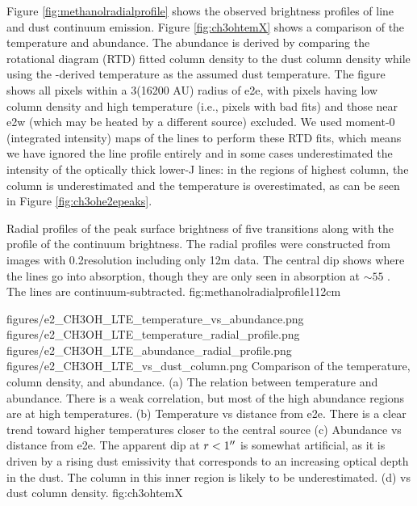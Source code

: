 \documentclass{aa}
\begin{document}
Figure \ref{fig:methanolradialprofile} shows the observed brightness profiles
of \methanol line and dust continuum emission.
Figure \ref{fig:ch3ohtemX} shows a comparison of the \methanol temperature and
abundance.  The \methanol abundance is derived by comparing the rotational
diagram (RTD) fitted \methanol column density to the dust column density while
using the \methanol-derived temperature as the assumed dust temperature.  The
figure shows all pixels within a 3\arcsec (16200 AU) radius of e2e, with pixels
having low column density and high temperature (i.e., pixels with bad fits) and
those near e2w (which may be heated by a different source) excluded.  We used
moment-0 (integrated intensity) maps of the \methanol lines to perform these
RTD fits, which means we have ignored the line profile entirely and in some
cases underestimated the intensity of the optically thick lower-J lines: in the
regions of highest column, the column is  underestimated and the temperature is
overestimated, as can be seen in Figure \ref{fig:ch3ohe2epeaks}.


{Radial profiles of the peak surface brightness of five \methanol transitions
along with the profile of the continuum brightness.  The radial profiles were
constructed from images with 0.2\arcsec resolution including only 12m data.
The central dip shows where the lines go into absorption, though they are only
seen in absorption at $\sim55$ \kms.  The \methanol lines are
continuum-subtracted.}
{fig:methanolradialprofile}{1}{12cm}

\FigureFour
{figures/e2_CH3OH_LTE_temperature_vs_abundance.png}
{figures/e2_CH3OH_LTE_temperature_radial_profile.png}
{figures/e2_CH3OH_LTE_abundance_radial_profile.png}
{figures/e2_CH3OH_LTE_vs_dust_column.png}
{Comparison of the \methanol temperature, column density, and abundance.
(a) The relation between temperature and abundance.  There is a weak correlation,
but most of the high abundance regions are at high temperatures.
(b) Temperature vs distance from e2e.  There is a clear trend toward higher
temperatures closer  to the central source
(c) Abundance vs distance from e2e.  The apparent dip at $r<1\mbox{$^{\prime\prime}$}$ is
somewhat artificial, as it is driven by a rising dust emissivity that
corresponds to an increasing optical depth in the dust.  The \methanol column
in this inner region is likely to be underestimated. 
(d) \methanol vs dust column density.  }
{fig:ch3ohtemX}
\end{document}
